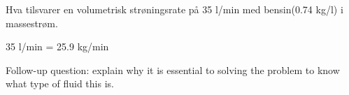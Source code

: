 

Hva tilsvarer en volumetrisk strøningsrate på 35 l/min med bensin(0.74 kg/l) i massestrøm. 








35 l/min = 25.9 kg/min

\vskip 10pt

Follow-up question: explain why it is essential to solving the problem to know what type of fluid this is.










